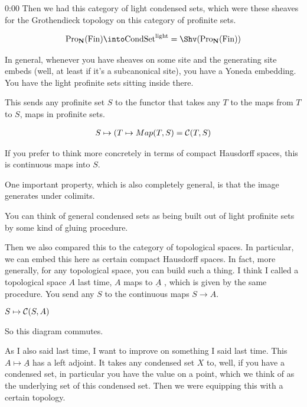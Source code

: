 \begin{unfinished}{0:00}
Then we had this category of light condensed sets, which were these sheaves for the Grothendieck topology on this category of profinite sets. 

\begin{align*} 
\Pro_{\N}(\Fin) \into \Cond\Set^{\light} = \Shv(\Pro_{\N}(\Fin)) %

\end{align*}

In general, whenever you have sheaves on some site and the generating site embeds (well, at least if it's a subcanonical site), you have a Yoneda embedding. 
You have the light profinite sets sitting inside there. 


This sends any profinite set $S$ to the functor that takes any $T$ to the maps from $T$ to $S$, maps in profinite sets. 

\begin{align*}
 S \mapsto (T \mapsto Map(T,S) = \Cont(T,S) %
\end{align*}


If you prefer to think more concretely in terms of compact Hausdorff spaces, this is continuous maps into $S$.

One important property, which is also completely general, is that the image generates under colimits. 

You can think of general condensed sets as being built out of light profinite sets by some kind of gluing procedure.


Then we also compared this to the category of topological spaces. In particular, we can embed this here as certain compact Hausdorff spaces. In fact, more generally, for any topological space, you can build such a thing. I think I called a topological space $A$ last time, $A$ maps to $\underline{A}$ , which is given by the same procedure. You send any $S$ to the continuous maps $S \to A$. 

$S \mapsto \mathcal{C}(S, A)$

So this diagram commutes.

As I also said last time, I want to improve on something I said last time. This $A \mapsto \underline{A}$ has a left adjoint. It takes any condensed set $X$ to, well, if you have a condensed set, in particular you have the value on a point, which we think of as the underlying set of this condensed set. 
Then we were equipping this with a certain topology.


\end{unfinished}
